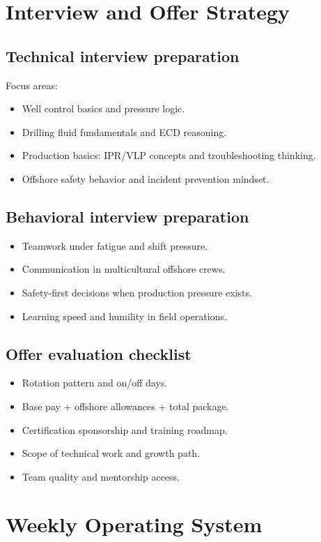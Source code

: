 \documentclass[11pt,openany]{book}
\begin{document}
\chapter{Interview and Offer Strategy}

\section{Technical interview preparation}
Focus areas:
\begin{itemize}
  \item Well control basics and pressure logic.
  \item Drilling fluid fundamentals and ECD reasoning.
  \item Production basics: IPR/VLP concepts and troubleshooting thinking.
  \item Offshore safety behavior and incident prevention mindset.
\end{itemize}

\section{Behavioral interview preparation}
\begin{itemize}
  \item Teamwork under fatigue and shift pressure.
  \item Communication in multicultural offshore crews.
  \item Safety-first decisions when production pressure exists.
  \item Learning speed and humility in field operations.
\end{itemize}

\section{Offer evaluation checklist}
\begin{itemize}
  \item Rotation pattern and on/off days.
  \item Base pay + offshore allowances + total package.
  \item Certification sponsorship and training roadmap.
  \item Scope of technical work and growth path.
  \item Team quality and mentorship access.
\end{itemize}

\chapter{Weekly Operating System}
\end{document}
